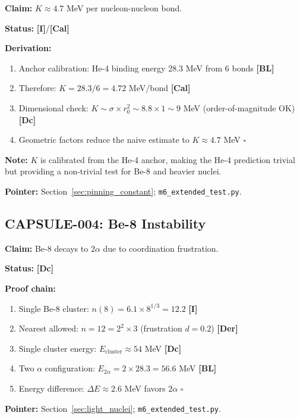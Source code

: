 \documentclass[11pt,a4paper]{article}
\newcommand{\tagI}{\textcolor{orange!80!black}{\textbf{[I]}}}
\newcommand{\tagDc}{\textcolor{blue!70!black}{\textbf{[Dc]}}}
\newcommand{\tagDer}{\textcolor{green!50!black}{\textbf{[Der]}}}
\newcommand{\tagCal}{\textcolor{purple!70!black}{\textbf{[Cal]}}}
\newcommand{\tagBL}{\textcolor{gray!70!black}{\textbf{[BL]}}}
\begin{document}
\textbf{Claim:} $K \approx 4.7$ MeV per nucleon-nucleon bond.

\textbf{Status:} \tagI{}/\tagCal{}

\textbf{Derivation:}
\begin{enumerate}
    \item Anchor calibration: He-4 binding energy 28.3 MeV from 6 bonds \tagBL{}
    \item Therefore: $K = 28.3/6 = 4.72$ MeV/bond \tagCal{}
    \item Dimensional check: $K \sim \sigma \times r_0^2 \sim 8.8 \times 1 \sim 9$ MeV (order-of-magnitude OK) \tagDc{}
    \item Geometric factors reduce the naive estimate to $K \approx 4.7$ MeV \quad $\square$
\end{enumerate}

\textbf{Note:} $K$ is calibrated from the He-4 anchor, making the He-4 prediction trivial but providing a non-trivial test for Be-8 and heavier nuclei.

\textbf{Pointer:} Section~\ref{sec:pinning_constant}; \texttt{m6\_extended\_test.py}.

\subsection{CAPSULE-004: Be-8 Instability}

\textbf{Claim:} Be-8 decays to $2\alpha$ due to coordination frustration.

\textbf{Status:} \tagDc{}

\textbf{Proof chain:}
\begin{enumerate}
    \item Single Be-8 cluster: $n(8) = 6.1 \times 8^{1/3} = 12.2$ \tagI{}
    \item Nearest allowed: $n = 12 = 2^2 \times 3$ (frustration $d = 0.2$) \tagDer{}
    \item Single cluster energy: $E_{\text{cluster}} \approx 54$ MeV \tagDc{}
    \item Two $\alpha$ configuration: $E_{2\alpha} = 2 \times 28.3 = 56.6$ MeV \tagBL{}
    \item Energy difference: $\Delta E \approx 2.6$ MeV favors $2\alpha$ \quad $\square$
\end{enumerate}

\textbf{Pointer:} Section~\ref{sec:light_nuclei}; \texttt{m6\_extended\_test.py}.

\end{document}
